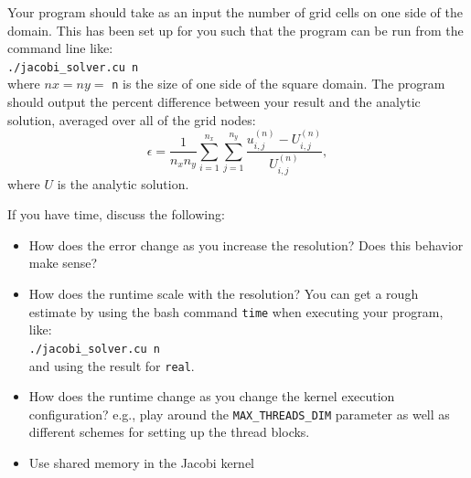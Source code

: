 \documentclass[11pt]{article}
\begin{document}
    Your program should take as an input the number of grid cells on one side of the domain.
    This has been set up for you such that the program can be run from the command line like: 
    \vspace{3mm}\\ \texttt{./jacobi\_solver.cu n} \vspace{3mm}\\
    where \(nx = ny = \) \texttt{n} is the size of one side of the square domain.
    The program should output the percent difference between your result and the analytic solution, averaged over all of the grid nodes:
    \begin{equation}
      \epsilon = \frac{1}{n_x n_y} \sum_{i=1}^{n_x} \sum_{j=1}^{n_y} \frac{u_{i,j}^{\left(n\right)} -
U_{i,j}^{\left(n\right)}}{U_{i,j}^{\left(n\right)}},
    \end{equation}
    where \(U\) is the analytic solution.
    
    If you have time, discuss the following:
    \begin{itemize}
      \item How does the error change as you increase the resolution? Does this behavior make sense?
      \item How does the runtime scale with the resolution? You can get a rough estimate by using the bash command \texttt{time} when executing your program, like:
    \vspace{3mm}\\ \texttt{./jacobi\_solver.cu n} \vspace{3mm}\\ and using the result for \texttt{real}. \\
      \item How does the runtime change as you change the kernel execution configuration?
        e.g., play around the \texttt{MAX\_THREADS\_DIM} parameter as well as different schemes for setting up the thread blocks.
      \item Use shared memory in the Jacobi kernel
    \end{itemize}


\end{document}
